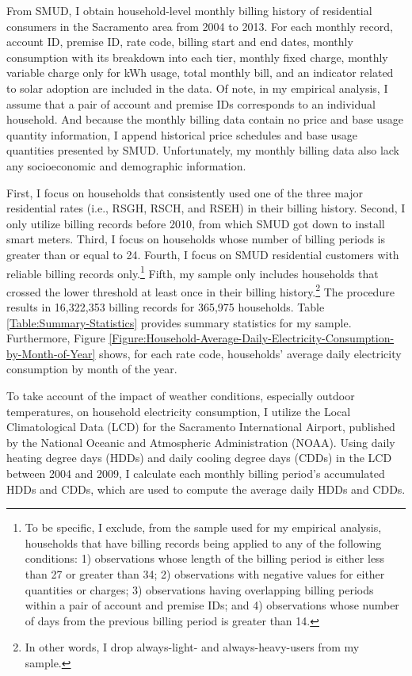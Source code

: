 From SMUD, I obtain household-level monthly billing history of residential consumers in the Sacramento area from 2004 to 2013. For each monthly record, account ID, premise ID, rate code, billing start and end dates, monthly consumption with its breakdown into each tier, monthly fixed charge, monthly variable charge only for kWh usage, total monthly bill, and an indicator related to solar adoption are included in the data. Of note, in my empirical analysis, I assume that a pair of account and premise IDs corresponds to an individual household. And because the monthly billing data contain no price and base usage quantity information, I append historical price schedules and base usage quantities presented by SMUD. Unfortunately, my monthly billing data also lack any socioeconomic and demographic information. 

First, I focus on households that consistently used one of the three major residential rates (i.e., RSGH, RSCH, and RSEH) in their billing history. Second, I only utilize billing records before 2010, from which SMUD got down to install smart meters. Third, I focus on households whose number of billing periods is greater than or equal to 24. Fourth, I focus on SMUD residential customers with reliable billing records only.\footnote{To be specific, I exclude, from the sample used for my empirical analysis, households that have billing records being applied to any of the following conditions: 1) observations whose length of the billing period is either less than 27 or greater than 34; 2) observations with negative values for either quantities or charges; 3) observations having overlapping billing periods within a pair of account and premise IDs; and 4) observations whose number of days from the previous billing period is greater than 14.} Fifth, my sample only includes households that crossed the lower threshold at least once in their billing history.\footnote{In other words, I drop always-light- and always-heavy-users from my sample. } The procedure results in 16,322,353 billing records for 365,975 households. Table \ref{Table:Summary-Statistics} provides summary statistics for my sample. Furthermore, Figure \ref{Figure:Household-Average-Daily-Electricity-Consumption-by-Month-of-Year} shows, for each rate code, households' average daily electricity consumption by month of the year. 

To take account of the impact of weather conditions, especially outdoor temperatures, on household electricity consumption, I utilize the Local Climatological Data (LCD) for the Sacramento International Airport, published by the National Oceanic and Atmospheric Administration (NOAA). Using daily heating degree days (HDDs) and daily cooling degree days (CDDs) in the LCD between 2004 and 2009, I calculate each monthly billing period's accumulated HDDs and CDDs, which are used to compute the average daily HDDs and CDDs. 
